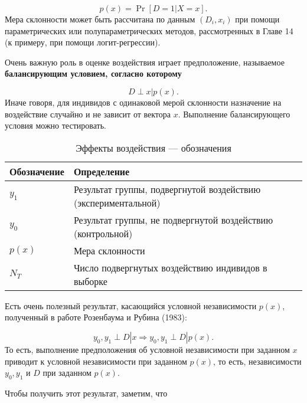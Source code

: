 \begin{equation}
\label{eq25.8}
p(x) = \Pr [D = 1| X = x].
\end{equation}
Мера склонности может быть рассчитана по данным $(D_i, x_i)$ при помощи параметрических или полупараметрических методов, рассмотренных в Главе 14 (к примеру, при помощи логит-регрессии). 

Очень важную роль в оценке воздействия играет предположение, называемое \bfseries балансирующим условием, \mdseries согласно которому

\begin{equation}
\label{eq25.9}
D \perp x | p (x).
\end{equation}
Иначе говоря, для индивидов с одинаковой мерой склонности назначение на воздействие случайно и не зависит от вектора $x$. Выполнение балансирующего условия  можно тестировать. 

\begin{table}[h!]
\caption{\label{tab:effectsnotation} Эффекты воздействия --- обозначения}
\begin{center}
\begin{tabular}{ll}
\hline
\hline
Обозначение & Определение \\
\hline
$y_1$ & Результат группы, подвергнутой воздействию (экспериментальной) \\
$y_0$ & Результат группы, не подвергнутой воздействию (контрольной) \\
$p(x)$ & Мера склонности \\
$N_T$ & Число подвергнутых воздействию индивидов в выборке \\
\hline
\hline
\end{tabular}
\end{center}
\end{table}

Есть очень полезный результат, касающийся условной независимости $p(x)$, полученный в работе Розенбаума и Рубина (1983):

\begin{equation}
\label{eq25.10}
y_0, y_1 \perp D | x \Rightarrow y_0, y_1 \perp D | p(x).
\end{equation}
То есть, выполнение предположения об условной независимости при заданном $x$ приводит к условной независимости при заданном $p(x)$, то есть, независимости $y_0, y_1$ и $D$ при заданном $p(x)$. 

Чтобы получить этот результат, заметим, что 

